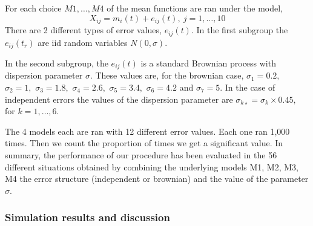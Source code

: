 \documentclass[12pt]{article}
\begin{document}
For each choice $M1,\ldots,M4$ of the mean functions are ran under the model,
\[X_{ij} = m_i(t) + e_{ij}(t),~ j=1,\ldots,10\]
There are 2 different types of error values, $e_{ij}(t)$. In the first subgroup the $e_{ij}(t_r)$ are
iid random variables $N(0,\sigma).$

In the second subgroup, the $e_{ij}(t)$ is a standard Brownian process with dispersion parameter $\sigma$.
These values are, for the brownian case, $\sigma_1 = 0.2,$  $\sigma_2 =1,$  $\sigma_3 =1.8,$  $\sigma_4 =2.6,$
$ \sigma_5 =3.4,$ $\sigma_6 =4.2$ and $\sigma_7 =5.$ In the case of independent errors the values of
  the dispersion parameter are $\sigma_{k\star} = \sigma_k\times 0.45,$ for $k = 1,\ldots,6.$

    The 4 models each are ran with 12 different error values. Each one ran 1,000 times.
    Then we count the proportion of times we get a significant value. In summary, the performance of
    our procedure has been evaluated in the 56 different situations obtained by combining the
    underlying models M1, M2, M3, M4 the error structure (independent or brownian) and the value of the parameter $\sigma.$

    \subsubsection{Simulation results and discussion}
\end{document}
